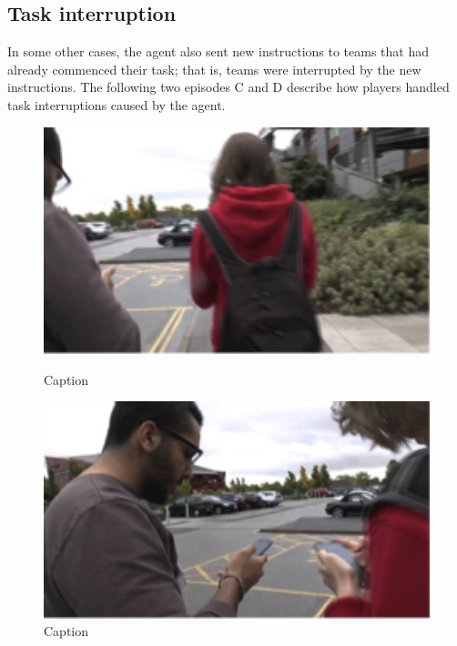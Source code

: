 \subsection{Task interruption}
In some other cases, the agent also sent new instructions to teams that had already commenced their task; that is, teams were interrupted by the new instructions. The following two episodes C and D describe how players handled task interruptions caused by the agent.\\

\begin{figure}[ht]
\centering
\begin{minipage}[b]{0.45\linewidth}
\includegraphics[width=1\textwidth]{img/study2/ep3/ep31}
\caption{Caption}
\label{fig:study2ep31}
\end{minipage}
\quad
\begin{minipage}[b]{0.45\linewidth}
 \includegraphics[width=1\textwidth]{img/study2/ep3/ep32}
\caption{Caption}
\label{fig:study2ep32}
\end{minipage}
\end{figure}

